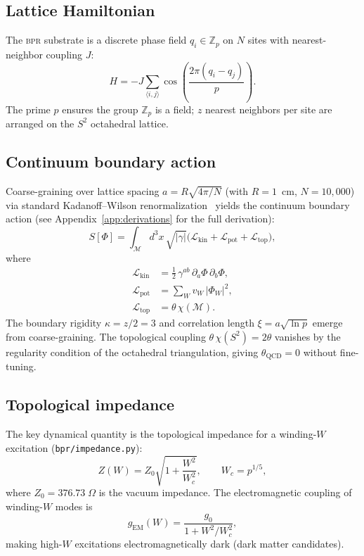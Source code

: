 \documentclass[aps,prd,twocolumn,superscriptaddress,longbibliography,nofootinbib]{revtex4-2}
\newcommand{\Zp}{\mathbb{Z}_p}
\newcommand{\Stwo}{S^2}
\newcommand{\Wc}{W_{\!c}}
\newcommand{\Zimp}{Z}
\newcommand{\Zvac}{Z_0}
\newcommand{\bpr}{\textsc{bpr}}
\begin{document}
\subsection{Lattice Hamiltonian}

The \bpr{} substrate is a discrete phase field $q_i \in \Zp$ on $N$ sites
with nearest-neighbor coupling $J$:
\begin{equation}
H = -J \sum_{\langle i,j\rangle}
  \cos\!\left(\frac{2\pi(q_i - q_j)}{p}\right).
\label{eq:H}
\end{equation}
The prime $p$ ensures the group $\Zp$ is a field; $z$ nearest neighbors per
site are arranged on the $\Stwo$ octahedral lattice.

\subsection{Continuum boundary action}

Coarse-graining over lattice spacing $a = R\sqrt{4\pi/N}$ (with $R = 1$~cm,
$N = 10{,}000$) via standard Kadanoff--Wilson renormalization~\cite{Wilson1971}
yields the continuum boundary action (see Appendix~\ref{app:derivations} for
the full derivation):
\begin{equation}
S[\Phi] = \int_{\mathcal{M}} d^3x\,\sqrt{|\gamma|}
  \bigl(\mathcal{L}_{\mathrm{kin}} +
         \mathcal{L}_{\mathrm{pot}} +
         \mathcal{L}_{\mathrm{top}}\bigr),
\label{eq:action}
\end{equation}
where
\begin{align}
\mathcal{L}_{\mathrm{kin}} &= \tfrac{1}{2}\,\gamma^{ab}\,
  \partial_a\Phi\,\partial_b\Phi, \\
\mathcal{L}_{\mathrm{pot}} &= \sum_W v_W\,|\Phi_W|^2, \\
\mathcal{L}_{\mathrm{top}} &= \theta\,\chi(\mathcal{M}).
\end{align}
The boundary rigidity $\kappa = z/2 = 3$ and correlation length
$\xi = a\sqrt{\ln p}$ emerge from coarse-graining.  The topological coupling
$\theta\,\chi(\Stwo) = 2\theta$ vanishes by the regularity condition of the
octahedral triangulation, giving $\theta_{\mathrm{QCD}} = 0$ without fine-tuning.

\subsection{Topological impedance}

The key dynamical quantity is the topological impedance for a winding-$W$
excitation (\texttt{bpr/impedance.py}):
\begin{equation}
\Zimp(W) = \Zvac\sqrt{1 + \frac{W^2}{\Wc^2}},
\qquad \Wc = p^{1/5},
\label{eq:impedance}
\end{equation}
where $\Zvac = 376.73\;\Omega$ is the vacuum impedance.
The electromagnetic coupling of winding-$W$ modes is
\begin{equation}
g_{\mathrm{EM}}(W) = \frac{g_0}{1 + W^2/\Wc^2},
\end{equation}
making high-$W$ excitations electromagnetically dark (dark matter candidates).
\end{document}
